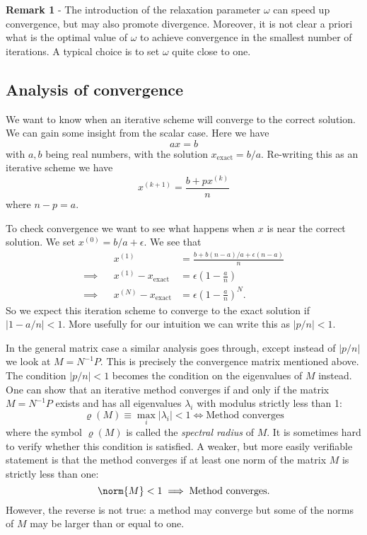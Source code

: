 \noindent \textbf{Remark 1} - The introduction of the relaxation
parameter $\omega$ can speed up convergence, but may also promote
divergence.    Moreover, it is not clear a priori what is the optimal
value of $\omega$ to achieve convergence in the smallest number of
iterations.    A typical choice is to set $\omega$ quite close to one.


\subsection{Analysis of convergence}

We want to know when an iterative scheme will converge to the correct solution.
We can gain some insight from the scalar case.
Here we have
%
\begin{equation}
  a x = b
\end{equation}
%
with $a, b$ being real numbers, with the solution $x_\text{exact} = b / a$.
Re-writing this as an iterative scheme we have
%
\begin{equation}
  x^{(k+1)} = \frac{b + p x^{(k)}}{n}
\end{equation}
%
where $n - p = a$.

To check convergence we want to see what happens when $x$ is near the correct solution.
We set $x^{(0)} = b / a + \epsilon$. We see that
%
\begin{align}
  && x^{(1)} &= \frac{b + b (n - a) / a + \epsilon (n - a)}{n} \\
  \implies && x^{(1)} - x_\text{exact} &= \epsilon \left( 1 - \frac{a}{n} \right) \\
  \implies && x^{(N)} - x_\text{exact} &= \epsilon \left( 1 - \frac{a}{n} \right)^N.
\end{align}
%
So we expect this iteration scheme to converge to the exact solution if $|1 - a/n| < 1$.
More usefully for our intuition we can write this as $| p / n | < 1$.

In the general matrix case a similar analysis goes through, except instead of $| p / n|$ we look at $M = N^{-1} P$.
This is precisely the convergence matrix mentioned above.
The condition $| p / n | < 1$ becomes the condition on the eigenvalues of $M$ instead.
One can show that an iterative method converges if and only if the matrix $M = N^{-1} P$ exists and has all eigenvalues $\lambda_i$ with modulus strictly less than 1:
%
\begin{equation*}
  \varrho(M) \equiv \max_i | \lambda_i | < 1 \Longleftrightarrow
  \text{Method converges}
\end{equation*}
%
where the symbol $\varrho(M)$ is called the \textit{spectral radius} of $M$.
It is sometimes hard to verify whether this condition is satisfied.
A weaker, but more easily verifiable statement is that the method converges if at least one norm of the matrix $M$ is strictly less than one:
%
\begin{equation*}
  \norm{ M } < 1 \implies \text{Method converges.}
\end{equation*}
%
However, the reverse is not true: a method may converge but some of the norms of $M$ may be larger than or equal to one.

